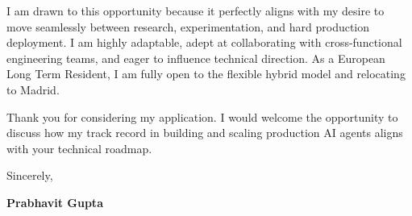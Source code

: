 \documentclass[11pt,a4paper]{article}
\begin{document}
\vspace{0.3cm}

\noindent
I am drawn to this opportunity because it perfectly aligns with my desire to move seamlessly between research, experimentation, and hard production deployment. I am highly adaptable, adept at collaborating with cross-functional engineering teams, and eager to influence technical direction. As a European Long Term Resident, I am fully open to the flexible hybrid model and relocating to Madrid.

\vspace{0.3cm}

\noindent
Thank you for considering my application. I would welcome the opportunity to discuss how my track record in building and scaling production AI agents aligns with your technical roadmap.

\vspace{0.5cm}

\noindent
Sincerely,

\vspace{0.3cm}

\noindent
\textbf{Prabhavit Gupta}
\end{document}
